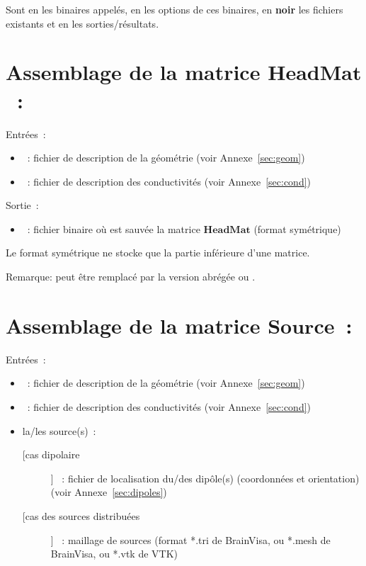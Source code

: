 \noindent
Sont en  les binaires appelés, en  les options de ces binaires, en \textbf{noir}
les fichiers existants et en  les sorties/résultats. 

\section{Assemblage de la matrice $\mathbf{HeadMat}$~:}
\label{sect: command assemble HeadMat}

\noindent
Entrées~: 
\begin{itemize}
    \item {}~: fichier de description de la géométrie (voir Annexe~\ref{sec:geom})
    \item {}~: fichier de description des conductivités (voir Annexe~\ref{sec:cond})
\end{itemize}

\noindent
Sortie~:
\begin{itemize}
    \item {}~: fichier binaire où est sauvée la matrice $\mathbf{HeadMat}$ (format symétrique)
\end{itemize}
Le format symétrique ne stocke que la partie inférieure d'une matrice.
\medskip

\noindent
{}
\medskip
Remarque:  peut être remplacé par la version abrégée  ou .

\section{Assemblage de la matrice $\mathbf{Source}$~:}
\label{sect: command assemble SourceMat}

\noindent
Entrées~: 
\begin{itemize}
    \item {}~: fichier de description de la géométrie (voir Annexe~\ref{sec:geom})
    \item {}~: fichier de description des conductivités (voir Annexe~\ref{sec:cond})
    \item la/les source(s)~:
        \begin{description}
            \item [[cas dipolaire]] ~: fichier de localisation du/des dipôle(s) (coordonnées et orientation)
                                    (voir Annexe~\ref{sec:dipoles}) 
            \item [[cas des sources distribuées]]  ~: maillage de sources (format *.tri de BrainVisa, ou *.mesh de BrainVisa, ou *.vtk de VTK) 
        \end{description}
\end{itemize}


